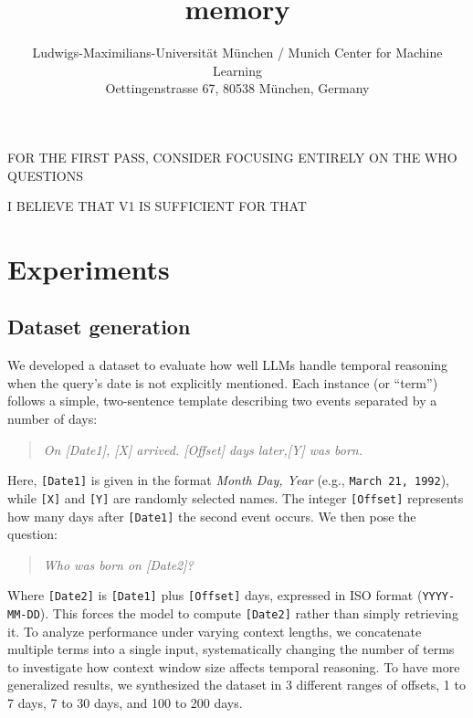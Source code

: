 \documentclass[11pt]{article}
\title{memory}
\author{  Ludwigs-Maximilians-Universität München / Munich Center for Machine Learning\\
  Oettingenstrasse 67, 80538 München, Germany \\
}
\begin{document}
\maketitle
\begin{abstract}

\end{abstract}



FOR THE FIRST PASS, CONSIDER  FOCUSING ENTIRELY ON THE WHO
QUESTIONS

I BELIEVE THAT V1 IS SUFFICIENT FOR THAT

\section{Experiments}


\subsection{Dataset generation}
We developed a dataset to evaluate how well LLMs handle temporal reasoning when the query's date is not explicitly mentioned. Each instance (or “term”) follows a simple, two-sentence template describing two events separated by a number of days:

\begin{quote}
\emph{On [Date1], [X] arrived. [Offset] days later,[Y] was born.}
\end{quote}

Here, \texttt{[Date1]} is given in the format \textit{Month Day, Year} (e.g., \texttt{March 21, 1992}), while \texttt{[X]} and \texttt{[Y]} are randomly selected names. The integer \texttt{[Offset]} represents how many days after \texttt{[Date1]} the second event occurs. We then pose the question:

\begin{quote}
\emph{Who was born on [Date2]?}
\end{quote}

Where \texttt{[Date2]} is \texttt{[Date1]} plus \texttt{[Offset]} days, expressed in ISO format (\texttt{YYYY-MM-DD}). This forces the model to compute \texttt{[Date2]} rather than simply retrieving it. To analyze performance under varying context lengths, we concatenate multiple terms into a single input, systematically changing the number of terms to investigate how context window size affects temporal reasoning. To have more generalized results, we synthesized the dataset in 3 different ranges of offsets, 1 to 7 days, 7 to 30 days, and 100 to 200 days.
\end{document}
